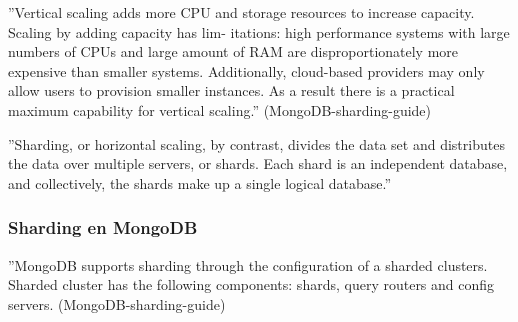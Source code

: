 ''Vertical scaling adds more CPU and storage resources to increase capacity. Scaling by adding capacity has lim-
itations: high performance systems with large numbers of CPUs and large amount of RAM are disproportionately
more expensive than smaller systems. Additionally, cloud-based providers may only allow users to provision smaller
instances. As a result there is a practical maximum capability for vertical scaling.'' (MongoDB-sharding-guide)

''Sharding, or horizontal scaling, by contrast, divides the data set and distributes the data over multiple servers, or
shards. Each shard is an independent database, and collectively, the shards make up a single logical database.''

\subsubsection{Sharding en MongoDB}

''MongoDB supports sharding through the configuration of a sharded clusters.
Sharded cluster has the following components: shards, query routers and config servers. (MongoDB-sharding-guide)



